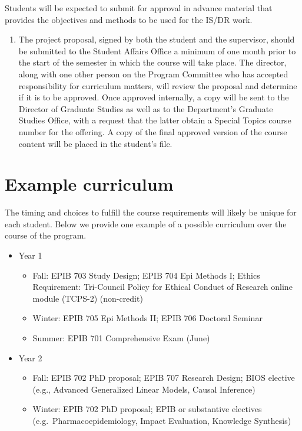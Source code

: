 \documentclass[
]{book}
\providecommand{\tightlist}{%
  \setlength{\itemsep}{0pt}\setlength{\parskip}{0pt}}
\begin{document}
Students will be expected to submit for approval in advance material that provides the objectives and methods to be used for the IS/DR work.

\begin{enumerate}
\def\labelenumi{\arabic{enumi}.}
\setcounter{enumi}{2}
\tightlist
\item
  The project proposal, signed by both the student and the supervisor, should be submitted to the Student Affairs Office a minimum of one month prior to the start of the semester in which the course will take place. The director, along with one other person on the Program Committee who has accepted responsibility for curriculum matters, will review the proposal and determine if it is to be approved. Once approved internally, a copy will be sent to the Director of Graduate Studies as well as to the Department's Graduate Studies Office, with a request that the latter obtain a Special Topics course number for the offering. A copy of the final approved version of the course content will be placed in the student's file.
\end{enumerate}

\hypertarget{example-curriculum-1}{%
\section{Example curriculum}\label{example-curriculum-1}}

The timing and choices to fulfill the course requirements will likely be unique for each student. Below we provide one example of a possible curriculum over the course of the program.

\begin{itemize}
\tightlist
\item
  Year 1

  \begin{itemize}
  \tightlist
  \item
    Fall: EPIB 703 Study Design; EPIB 704 Epi Methods I; Ethics Requirement: Tri-Council Policy for Ethical Conduct of Research online module (TCPS-2) (non-credit)\\
  \item
    Winter: EPIB 705 Epi Methods II; EPIB 706 Doctoral Seminar
  \item
    Summer: EPIB 701 Comprehensive Exam (June)
  \end{itemize}
\item
  Year 2

  \begin{itemize}
  \tightlist
  \item
    Fall: EPIB 702 PhD proposal; EPIB 707 Research Design; BIOS elective (e.g., Advanced Generalized Linear Models, Causal Inference)
  \item
    Winter: EPIB 702 PhD proposal; EPIB or substantive electives (e.g.~Pharmacoepidemiology, Impact Evaluation, Knowledge Synthesis)
  \end{itemize}
\end{itemize}
\end{document}
